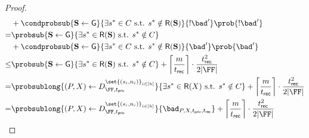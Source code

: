 \begin{proof}
\begin{align}
		     & + \condprobsub{\mdssShareList \gets \mdssG}{\exists \mdssSecret^* \in \mdssCS \text{ s.t. } \mdssSecret^* \notin \mdssShortRecon(\mdssShareList)}{!\bad'} \prob{!\bad'}                                                                                             
             \\
		= &
		\probsub{\mdssShareList \gets \mdssG}{
			\exists \mdssSecret^* \in \mdssShortRecon(\mdssShareList) \text{ s.t. } \mdssSecret^* \notin \mdssCS}
		\notag                                                                                                                                                                                                                                                      \\
		     & + \condprobsub{\mdssShareList \gets \mdssG}{\exists \mdssSecret^* \in \mdssCS \text{ s.t. } \mdssSecret^* \notin \mdssShortRecon(\mdssShareList)}{\bad'} \prob{\bad'}                                                                                            
             \label{eq:gs-corr-GS} \\
		\leq &
		\probsub{\mdssShareList \gets \mdssG}{
			\exists \mdssSecret^* \in \mdssShortRecon(\mdssShareList) \text{ s.t. } \mdssSecret^* \notin \mdssCS} + \mdssBPB
             \label{eq:gs-bad-prime-bound} \\
		=    & \probsublong{(\mdssPolySet, \mdssPointSet) \gets \mdssHonestDist{\FF}{\mdssPrivThr}{\set{(\mdssSecret_i, \mdssNumShares_i)}_{i \in [\mdssNumShareSets]}}}{
			       \exists \mdssSecret^* \in \mdssShortRecon(\mdssPointSet) \text{ s.t. } \mdssSecret^* \notin \mdssCS} + \mdssBPB                                                                 \label{eq:gs-corr-const}                                                       \\ 
		=    & \probsublong{(\mdssPolySet, \mdssPointSet) \gets \mdssHonestDist{\FF}{\mdssPrivThr}{\set{(\mdssSecret_i, \mdssNumShares_i)}_{i \in [\mdssNumShareSets]}}}{\bad_{\mdssPolySet, \mdssPointSet, \mdssPrivThr, \mdssRecThr}} + \mdssBPB                             \\

\end{align}
\end{proof}

